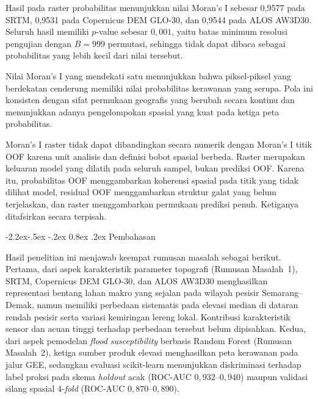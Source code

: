 \documentclass[12pt,a4paper]{article}
\makeatletter
\renewcommand\subsection{\@startsection{subsection}{2}{\z@}%
  {-2.2ex\@plus -.5ex \@minus -.2ex}%
  {0.8ex \@plus .2ex}%
  {\normalfont\normalsize\bfseries}}
\makeatother
\begin{document}
Hasil pada raster probabilitas menunjukkan nilai Moran's I sebesar 0,9577
pada SRTM, 0,9531 pada Copernicus DEM GLO-30, dan 0,9544 pada ALOS AW3D30.
Seluruh hasil memiliki $p$-value sebesar $0{,}001$, yaitu batas minimum
resolusi pengujian dengan $B=999$ permutasi, sehingga tidak dapat dibaca
sebagai probabilitas yang lebih kecil dari nilai tersebut.

Nilai Moran's I yang mendekati satu menunjukkan bahwa piksel-piksel yang
berdekatan cenderung memiliki nilai probabilitas kerawanan yang serupa. Pola
ini konsisten dengan sifat permukaan geografis yang berubah secara kontinu
dan menunjukkan adanya pengelompokan spasial yang kuat pada ketiga peta
probabilitas.

Moran's I raster tidak dapat dibandingkan secara numerik dengan Moran's I
titik OOF karena unit analisis dan definisi bobot spasial berbeda. Raster
merupakan keluaran model yang dilatih pada seluruh sampel, bukan prediksi OOF.
Karena itu, probabilitas OOF menggambarkan koherensi spasial pada titik yang
tidak dilihat model, residual OOF menggambarkan struktur galat yang belum
terjelaskan, dan raster menggambarkan permukaan prediksi penuh. Ketiganya
ditafsirkan secara terpisah.

\subsection{Pembahasan}
\label{ssec:pembahasan}
\enlargethispage{\baselineskip}

Hasil penelitian ini menjawab keempat rumusan masalah sebagai berikut.
Pertama, dari
aspek karakteristik parameter topografi (Rumusan Masalah~1), SRTM, Copernicus
DEM GLO-30, dan ALOS AW3D30 menghasilkan representasi bentang lahan makro yang
sejalan pada wilayah pesisir Semarang--Demak, namun memiliki perbedaan
sistematis pada elevasi median di dataran rendah pesisir serta variasi
kemiringan lereng lokal. Kontribusi karakteristik sensor dan acuan tinggi
terhadap perbedaan tersebut belum dipisahkan. Kedua, dari aspek pemodelan \textit{flood
susceptibility} berbasis Random Forest (Rumusan Masalah~2), ketiga sumber
produk elevasi menghasilkan peta kerawanan pada jalur GEE, sedangkan
evaluasi scikit-learn menunjukkan diskriminasi terhadap label proksi
pada skema \textit{holdout} acak
(ROC-AUC $0{,}932$--$0{,}940$) maupun validasi silang spasial 4-\textit{fold}
(ROC-AUC $0{,}870$--$0{,}890$).
\end{document}
